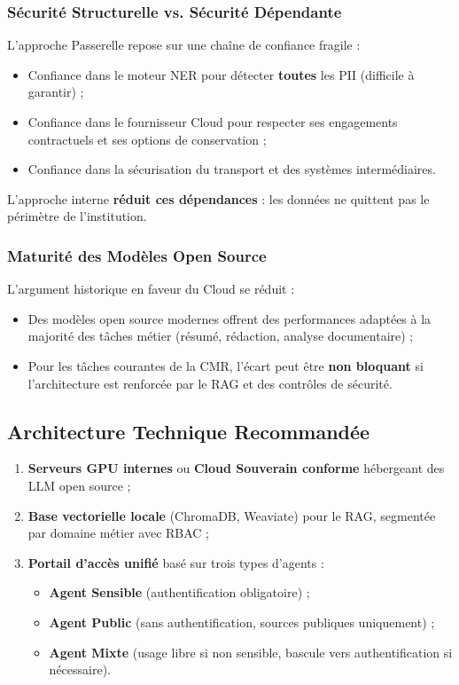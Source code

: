 \documentclass[12pt, a4paper]{report}
\begin{document}
\subsubsection{Sécurité Structurelle vs. Sécurité Dépendante}

L'approche Passerelle repose sur une chaîne de confiance fragile :

\begin{itemize}
  \item Confiance dans le moteur NER pour détecter \textbf{toutes} les
        PII (difficile à garantir) ;
  \item Confiance dans le fournisseur Cloud pour respecter ses
        engagements contractuels et ses options de conservation ;
  \item Confiance dans la sécurisation du transport et des systèmes
        intermédiaires.
\end{itemize}

L'approche interne \textbf{réduit ces dépendances} : les données ne
quittent pas le périmètre de l'institution.

\subsubsection{Maturité des Modèles Open Source}

L'argument historique en faveur du Cloud se réduit :

\begin{itemize}
  \item Des modèles open source modernes offrent des performances
        adaptées à la majorité des tâches métier (résumé, rédaction,
        analyse documentaire) ;
  \item Pour les tâches courantes de la CMR, l'écart peut être
        \textbf{non bloquant} si l'architecture est renforcée par le RAG
        et des contrôles de sécurité.
\end{itemize}

\subsection{Architecture Technique Recommandée}

\begin{enumerate}
  \item \textbf{Serveurs GPU internes} ou \textbf{Cloud Souverain
        conforme} hébergeant des LLM open source ;
  \item \textbf{Base vectorielle locale} (ChromaDB, Weaviate) pour le
        RAG, segmentée par domaine métier avec RBAC ;
  \item \textbf{Portail d'accès unifié} basé sur trois types d'agents :
  \begin{itemize}
    \item \textbf{Agent Sensible} (authentification obligatoire) ;
    \item \textbf{Agent Public} (sans authentification, sources publiques
          uniquement) ;
    \item \textbf{Agent Mixte} (usage libre si non sensible, bascule
          vers authentification si nécessaire).
  \end{itemize}
\end{enumerate}
\end{document}
